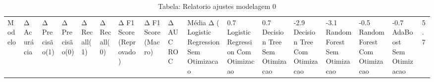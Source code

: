 \begin{table}[H] %
    \centering
    \caption{Tabela: Relatorio ajustes modelagem 0}
    \label{tab:relatorio_ajustes_modelagem_0}
    \renewcommand{\arraystretch}{1.25} %
    \begin{adjustwidth}{ -1in }{ -1in } %
    \centering %
    \small %
    \begin{tabular}{lllllllllll}
\toprule
                            Modelo & Δ Acurácia & Δ Precisão(1) & Δ Precisão(0) & Δ Recall(1) & Δ Recall(0) & Δ F1 Score (Reprovado) & Δ F1 Score (Macro) & Δ AUC ROC & Média Δ (%
\midrule
Logistic Regression Sem Otimizacao &       0.7%
Logistic Regression Com Otimizacao &       0.7%
      Decision Tree Sem Otimizacao &      -2.9%
      Decision Tree Com Otimizacao &      -3.1%
      Random Forest Sem Otimizacao &      -0.5%
      Random Forest Com Otimizacao &      -0.7%
           AdaBoost Sem Otimizacao &       5.7%

\end{tabular}
\end{adjustwidth}
\end{table}
